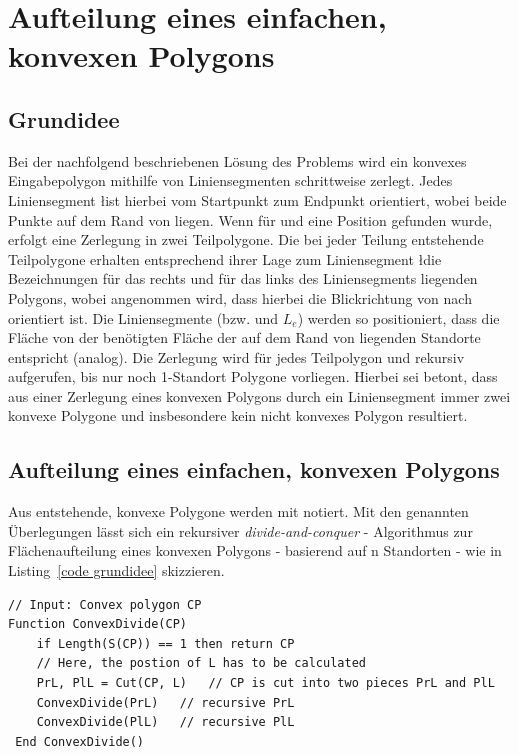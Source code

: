 \documentclass[ngerman]{seminarbeitrag}
\begin{document}
\section{Aufteilung eines einfachen, konvexen Polygons}\label{konvex}
\subsection{Grundidee}\label{grundidee konvex}
Bei der nachfolgend beschriebenen Lösung des Problems wird ein konvexes Eingabepolygon \cp mithilfe von Liniensegmenten schrittweise zerlegt. Jedes Liniensegment
\l ist hierbei vom Startpunkt \ls zum Endpunkt \Le orientiert, wobei beide Punkte auf dem Rand von \cp liegen. Wenn für \ls und \Le eine Position gefunden wurde, erfolgt eine Zerlegung in zwei Teilpolygone.
Die bei jeder Teilung entstehende Teilpolygone erhalten entsprechend ihrer Lage zum Liniensegment \l die Bezeichnungen \prl für das rechts und \pll für das links
des Liniensegments liegenden Polygons, wobei angenommen wird, dass hierbei die Blickrichtung von \ls nach \Le orientiert ist. Die Liniensegmente (bzw. \ls und $L_{e}$) werden so positioniert, dass die Fläche von \prl der benötigten Fläche der auf dem Rand von \prl liegenden Standorte entspricht (\pll analog). Die Zerlegung wird für jedes Teilpolygon \prl und \pll rekursiv aufgerufen, bis nur noch 1-Standort Polygone vorliegen. Hierbei sei betont, dass aus einer Zerlegung eines konvexen Polygons durch ein Liniensegment immer zwei konvexe Polygone und insbesondere kein nicht konvexes Polygon resultiert.

\subsection{Aufteilung eines einfachen, konvexen Polygons}\label{aufteilung konvex}
Aus \cp entstehende, konvexe Polygone werden mit \cpi notiert. Mit den genannten Überlegungen lässt sich ein rekursiver \emph{divide-and-conquer} - Algorithmus
zur Flächenaufteilung eines konvexen Polygons - basierend auf n Standorten - wie in Listing~\ref{code grundidee} skizzieren.

\begin{lstlisting}[float,caption={Die Grundidee hinter dem Algorithmus \con}, frame=single, label=code grundidee]
// Input: Convex polygon CP
Function ConvexDivide(CP)
    if Length(S(CP)) == 1 then return CP
    // Here, the postion of L has to be calculated
    PrL, PlL = Cut(CP, L)   // CP is cut into two pieces PrL and PlL
    ConvexDivide(PrL)   // recursive PrL
    ConvexDivide(PlL)   // recursive PlL
 End ConvexDivide() 
\end{lstlisting}
\end{document}
